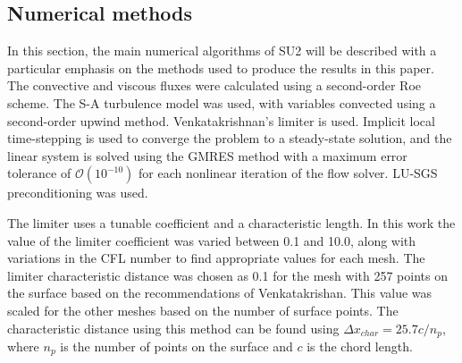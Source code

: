 
\subsection*{Numerical methods}
In this section, the main numerical algorithms of SU2 will be described with a particular emphasis on the methods used to produce the results in this paper. The convective and viscous fluxes were calculated using a second-order Roe scheme. The S-A turbulence model was used, with variables convected using a second-order upwind method. Venkatakrishnan's limiter is used. Implicit local time-stepping is used to converge the problem to a steady-state solution, and the linear system is solved using the GMRES method with a maximum error tolerance of $\mathcal{O}(10^{-10})$ for each nonlinear iteration of the flow solver. LU-SGS preconditioning was used.

The limiter uses a tunable coefficient and a characteristic length. In this work the value of the limiter coefficient was varied between 0.1 and 10.0, along with variations in the CFL number to find appropriate values for each mesh. The limiter characteristic distance was chosen as 0.1 for the mesh with 257 points on the surface based on the recommendations of Venkatakrishan\cite{Venkatakrishnan:1993}. This value was scaled for the other meshes based on the number of surface points. The characteristic distance using this method can be found using $\Delta x_{char} = 25.7 c  / n_p $, where $n_p$ is the number of points on the surface and $c$ is the chord length. 

